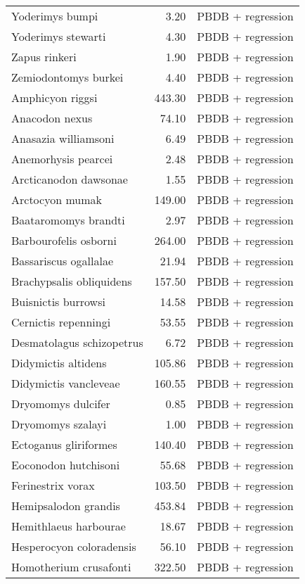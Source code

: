 \begin{table}[ht]
\begin{tabular}{lrl}
  Yoderimys bumpi & 3.20 & PBDB + regression \\ 
  Yoderimys stewarti & 4.30 & PBDB + regression \\ 
  Zapus rinkeri & 1.90 & PBDB + regression \\ 
  Zemiodontomys burkei & 4.40 & PBDB + regression \\ 
  Amphicyon riggsi & 443.30 & PBDB + regression \\ 
  Anacodon nexus & 74.10 & PBDB + regression \\ 
  Anasazia williamsoni & 6.49 & PBDB + regression \\ 
  Anemorhysis pearcei & 2.48 & PBDB + regression \\ 
  Arcticanodon dawsonae & 1.55 & PBDB + regression \\ 
  Arctocyon mumak & 149.00 & PBDB + regression \\ 
  Baataromomys brandti & 2.97 & PBDB + regression \\ 
  Barbourofelis osborni & 264.00 & PBDB + regression \\ 
  Bassariscus ogallalae & 21.94 & PBDB + regression \\ 
  Brachypsalis obliquidens & 157.50 & PBDB + regression \\ 
  Buisnictis burrowsi & 14.58 & PBDB + regression \\ 
  Cernictis repenningi & 53.55 & PBDB + regression \\ 
  Desmatolagus schizopetrus & 6.72 & PBDB + regression \\ 
  Didymictis altidens & 105.86 & PBDB + regression \\ 
  Didymictis vancleveae & 160.55 & PBDB + regression \\ 
  Dryomomys dulcifer & 0.85 & PBDB + regression \\ 
  Dryomomys szalayi & 1.00 & PBDB + regression \\ 
  Ectoganus gliriformes & 140.40 & PBDB + regression \\ 
  Eoconodon hutchisoni & 55.68 & PBDB + regression \\ 
  Ferinestrix vorax & 103.50 & PBDB + regression \\ 
  Hemipsalodon grandis & 453.84 & PBDB + regression \\ 
  Hemithlaeus harbourae & 18.67 & PBDB + regression \\ 
  Hesperocyon coloradensis & 56.10 & PBDB + regression \\ 
  Homotherium crusafonti & 322.50 & PBDB + regression \\ 

\end{tabular}
\end{table}
